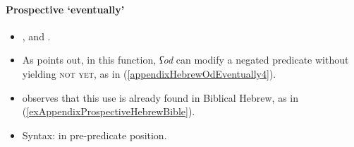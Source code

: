 \paragraph{Prospective \lq eventually'}\label{appendixHebrewOdProspective}
\begin{itemize}
	\item \textcite{FrancezOd}, \textcite[142]{Koenig1991} and \textcite{Tobin1985}.
	\item As \textcite{FrancezOd} points out, in this function, \textit{ʕod} can modify a negated predicate without yielding \textsc{not yet}, as in (\ref{appendixHebrewOdEventually4}).
	\item  \textcite{FrancezOd} observes that this use is already found in Biblical Hebrew, as in  (\ref{exAppendixProspectiveHebrewBible}).
	\item Syntax: in pre-predicate position.
\end{itemize}
